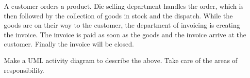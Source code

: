 \documentclass[a4paper,11pt]{exam}
\begin{document}
\begin{questions}

A customer orders a product. Die selling department handles the order, which is then followed by the collection of goods in stock
and the dispatch. While the goods are on their way to the customer, the department of invoicing is creating the invoice. The invoice
is paid as soon as the goods and the invoice arrive at the customer. Finally the invoice will be closed.

Make a UML activity diagram to describe the above. Take care of the areas of responsibility.
\end{questions}
\end{document}
